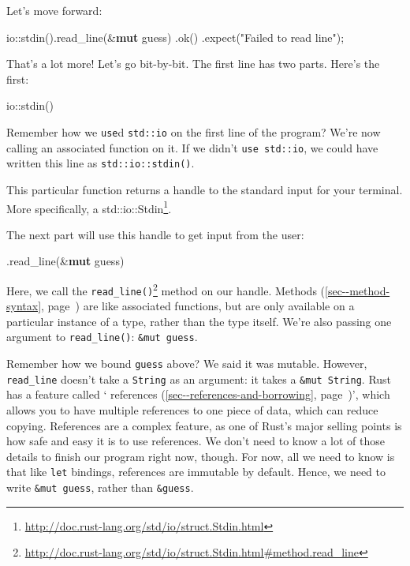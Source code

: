 \documentclass[a4paper,]{book}
\renewcommand*{\hyperref}[2][\ar]{%
  \def\ar{#2}%
  #2 (\autoref{#1}, page~\pageref{#1})}
\newenvironment{Shaded}{\begin{snugshade}}{\end{snugshade}}
\newcommand{\KeywordTok}[1]{\textcolor[rgb]{0.13,0.29,0.53}{\textbf{{#1}}}}
\newcommand{\StringTok}[1]{\textcolor[rgb]{0.31,0.60,0.02}{{#1}}}
\newcommand{\NormalTok}[1]{{#1}}
\renewcommand{\href}[2]{#2\footnote{\url{#1}}}
\begin{document}
Let's move forward:

\begin{Shaded}
\begin{Highlighting}[]
    \NormalTok{io::stdin().read_line(&}\KeywordTok{mut} \NormalTok{guess)}
        \NormalTok{.ok()}
        \NormalTok{.expect(}\StringTok{"Failed to read line"}\NormalTok{);}
\end{Highlighting}
\end{Shaded}

That's a lot more! Let's go bit-by-bit. The first line has two parts.
Here's the first:

\begin{Shaded}
\begin{Highlighting}[]
\NormalTok{io::stdin()}
\end{Highlighting}
\end{Shaded}

Remember how we \texttt{use}d \texttt{std::io} on the first line of the
program? We're now calling an associated function on it. If we didn't
\texttt{use\ std::io}, we could have written this line as
\texttt{std::io::stdin()}.

This particular function returns a handle to the standard input for your
terminal. More specifically, a
\href{http://doc.rust-lang.org/std/io/struct.Stdin.html}{std::io::Stdin}.

The next part will use this handle to get input from the user:

\begin{Shaded}
\begin{Highlighting}[]
\NormalTok{.read_line(&}\KeywordTok{mut} \NormalTok{guess)}
\end{Highlighting}
\end{Shaded}

Here, we call the
\href{http://doc.rust-lang.org/std/io/struct.Stdin.html\#method.read_line}{\texttt{read\_line()}}
method on our handle. \hyperref[sec--method-syntax]{Methods} are like
associated functions, but are only available on a particular instance of
a type, rather than the type itself. We're also passing one argument to
\texttt{read\_line()}: \texttt{\&mut\ guess}.

Remember how we bound \texttt{guess} above? We said it was mutable.
However, \texttt{read\_line} doesn't take a \texttt{String} as an
argument: it takes a \texttt{\&mut\ String}. Rust has a feature called
`\hyperref[sec--references-and-borrowing]{references}', which allows you
to have multiple references to one piece of data, which can reduce
copying. References are a complex feature, as one of Rust's major
selling points is how safe and easy it is to use references. We don't
need to know a lot of those details to finish our program right now,
though. For now, all we need to know is that like \texttt{let} bindings,
references are immutable by default. Hence, we need to write
\texttt{\&mut\ guess}, rather than \texttt{\&guess}.
\end{document}
